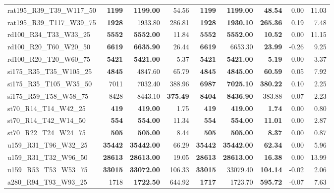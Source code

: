 \documentclass{singlecol-new}
\begin{document}
\begin{scriptsize}
\begin{longtable}{lrrrrrrrr}
		rat195\_R39\_T39\_W117\_50 & \textbf{1199} & \textbf{1199.00} & 54.56 & \textbf{1199} & \textbf{1199.00} & \textbf{48.54} & 0.00 & 11.03 \\
		rat195\_R39\_T117\_W39\_75 & \textbf{1928} & 1933.80 & 286.81 & \textbf{1928} & \textbf{1930.10} & \textbf{265.36} & 0.19 & 7.48 \\
		rd100\_R34\_T33\_W33\_25 & \textbf{5552} & \textbf{5552.00} & 11.84 & \textbf{5552} & \textbf{5552.00} & \textbf{10.52} & 0.00 & 11.15 \\
		rd100\_R20\_T60\_W20\_50 & \textbf{6619} & \textbf{6635.90} & 26.44 & \textbf{6619} & 6653.30 & \textbf{23.99} & -0.26 & 9.25 \\
		rd100\_R20\_T20\_W60\_75 & \textbf{5421} & \textbf{5421.00} & 5.37 & \textbf{5421} & \textbf{5421.00} & \textbf{5.19} & 0.00 & 3.37 \\
		si175\_R35\_T35\_W105\_25 & \textbf{4845} & 4847.60 & 65.79 & \textbf{4845} & \textbf{4845.00} & \textbf{60.59} & 0.05 & 7.92 \\
		si175\_R35\_T105\_W35\_50 & 7011 & 7032.40 & 388.96 & \textbf{6987} & \textbf{7025.10} & \textbf{380.22} & 0.10 & 2.25 \\
		si175\_R59\_T58\_W58\_75 & 8428 & 8443.10 & \textbf{375.49} & \textbf{8404} & \textbf{8436.90} & 383.88 & 0.07 & -2.23 \\
		st70\_R14\_T14\_W42\_25 & \textbf{419} & \textbf{419.00} & 1.75 & \textbf{419} & \textbf{419.00} & \textbf{1.74} & 0.00 & 0.80 \\
		st70\_R14\_T42\_W14\_50 & \textbf{554} & \textbf{554.00} & 11.34 & \textbf{554} & \textbf{554.00} & \textbf{11.01} & 0.00 & 2.87 \\
		st70\_R22\_T24\_W24\_75 & \textbf{505} & \textbf{505.00} & 8.44 & \textbf{505} & \textbf{505.00} & \textbf{8.37} & 0.00 & 0.87 \\
		u159\_R31\_T96\_W32\_25 & \textbf{35442} & \textbf{35442.00} & 66.29 & \textbf{35442} & \textbf{35442.00} & \textbf{62.34} & 0.00 & 5.96 \\
		u159\_R31\_T32\_W96\_50 & \textbf{28613} & \textbf{28613.00} & 19.05 & \textbf{28613} & \textbf{28613.00} & \textbf{16.38} & 0.00 & 13.99 \\
		u159\_R53\_T53\_W53\_75 & \textbf{33015} & \textbf{33072.00} & 106.33 & \textbf{33015} & 33079.40 & \textbf{104.14} & -0.02 & 2.06 \\
		a280\_R94\_T93\_W93\_25 & 1718 & \textbf{1722.50} & 644.92 & \textbf{1717} & 1723.70 & \textbf{595.72} & -0.07 & 7.63 \\

\end{longtable}
\end{scriptsize}
\end{document}
